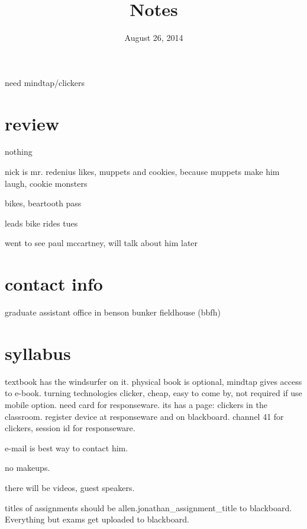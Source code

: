 \documentclass[letterpaper]{article}
\begin{document}
\title{Notes}
\date{August 26, 2014}
\maketitle

need mindtap/clickers

\section*{review}
nothing

nick is mr. redenius
likes, muppets and cookies, because muppets make him laugh, cookie monsters

bikes, beartooth pass

leads bike rides tues

went to see paul mccartney, will talk about him later

\section*{contact info}
graduate assistant office in benson bunker fieldhouse (bbfh)

\section*{syllabus}
textbook has the windsurfer on it. physical book is optional, mindtap gives access to e-book.  
turning technologies clicker, cheap, easy to come by, not required if use mobile option.  
need card for responseware.
its has a page: clickers in the classroom.
register device at responseware and on blackboard.
channel 41 for clickers, session id for responseware.

e-mail is best way to contact him.

no makeups.

there will be videos, guest speakers.

titles of assignments should be allen.jonathan\_assignment\_title to blackboard.
Everything but exams get uploaded to blackboard.
\end{document}
